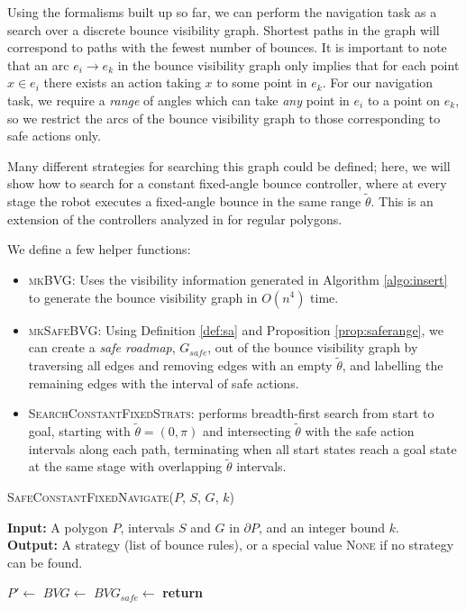 \documentclass[]{styles/svproc}  %
\begin{document}
Using the formalisms built up so far, we can perform the navigation task as a
search over a discrete bounce visibility graph. Shortest paths in the graph 
will correspond to paths with the fewest number of bounces. It is important to
note that an arc $e_i \to e_k$ in the bounce visibility graph only implies that for each
point $x \in e_i$ there exists an action taking $x$ to some point in $e_k$. For
our navigation task, we require a {\em range} of angles which can take {\em any}
point in $e_i$ to a point on $e_k$, so we restrict the arcs of the bounce
visibility graph to those corresponding to safe actions only.

Many different
strategies for searching this graph could be defined; here, we will show how to
search for a constant fixed-angle bounce controller, where at every stage the
robot executes a fixed-angle bounce in the same range $\tilde{\theta}$. This is an
extension of the controllers analyzed in \cite{NilBecLav17} for regular polygons.

We define a few helper functions:

\begin{itemize}
\item \textsc{mkBVG}: Uses the visibility information generated in Algorithm
\ref{algo:insert} to generate the bounce visibility graph in $O(n^4)$ time.
\item \textsc{mkSafeBVG}: Using Definition \ref{def:sa} and Proposition \ref{prop:saferange}, we can create a \emph{safe roadmap}, $G_{safe}$,
        out of the bounce visibility graph by traversing all edges and removing edges with an 
        empty $\tilde{\theta}$, and labelling the remaining edges with the interval 
        of safe actions.
\item \textsc{SearchConstantFixedStrats}: performs breadth-first search from
start to goal, starting with $\tilde{\theta} = (0, \pi)$ and intersecting
$\tilde{\theta}$ with the safe action intervals along each path, terminating
when all start states reach a goal state at the same stage with overlapping
$\tilde{\theta}$ intervals.
\end{itemize}

\begin{algorithm}
\caption{\textsc{SafeConstantFixedNavigate}($P$, $S$, $G$, $k$)}
\label{algo:nav}
\hspace*{\algorithmicindent} \textbf{Input:} A polygon $P$, intervals $S$ and
$G$ in $\partial P$, and an integer bound $k$.\\
\hspace*{\algorithmicindent} \textbf{Output:} A strategy (list of bounce rules),
or a special value \textsc{None} if no strategy can be found.
\begin{algorithmic}[1]
\State $P' \gets$ 
\State $BVG \gets$ 
\State $BVG_{safe} \gets$ 
\State \textbf{return} 
\end{algorithmic}
\end{algorithm}
\end{document}
